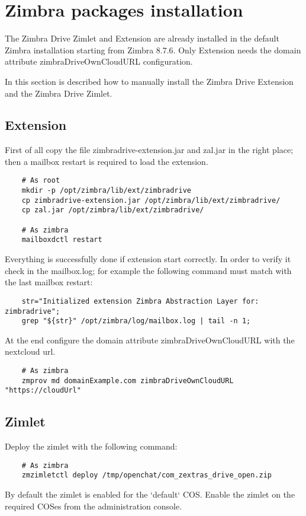 \section{Zimbra packages installation}

\begin{warning}
    The Zimbra Drive Zimlet and Extension are already installed in the default Zimbra installation
    starting from Zimbra 8.7.6. Only Extension needs the domain attribute zimbraDriveOwnCloudURL configuration.
\end{warning}
In this section is described how to manually install the Zimbra Drive Extension and the Zimbra Drive Zimlet.
    \subsection{Extension}
    First of all copy the file zimbradrive-extension.jar and zal.jar in the right place;
    then a mailbox restart is required to load the extension.
    \begin{verbatim}
    # As root
    mkdir -p /opt/zimbra/lib/ext/zimbradrive
    cp zimbradrive-extension.jar /opt/zimbra/lib/ext/zimbradrive/
    cp zal.jar /opt/zimbra/lib/ext/zimbradrive/
    
    # As zimbra
    mailboxdctl restart
    \end{verbatim}
    Everything is successfully done if extension start correctly. In order to verify it check in the mailbox.log;
    for example the following command must match with the last mailbox restart:
    \begin{verbatim}
    str="Initialized extension Zimbra Abstraction Layer for: zimbradrive";
    grep "${str}" /opt/zimbra/log/mailbox.log | tail -n 1;
    \end{verbatim}

    At the end configure the domain attribute zimbraDriveOwnCloudURL with the nextcloud url.
    
    \begin{verbatim}
    # As zimbra
    zmprov md domainExample.com zimbraDriveOwnCloudURL "https://cloudUrl"
    \end{verbatim}

    \subsection{Zimlet}
    Deploy the zimlet with the following command:
    \begin{verbatim}
    # As zimbra
    zmzimletctl deploy /tmp/openchat/com_zextras_drive_open.zip
    \end{verbatim}
    By default the zimlet is enabled for the `default` COS.
    Enable the zimlet on the required COSes from the administration console.

    